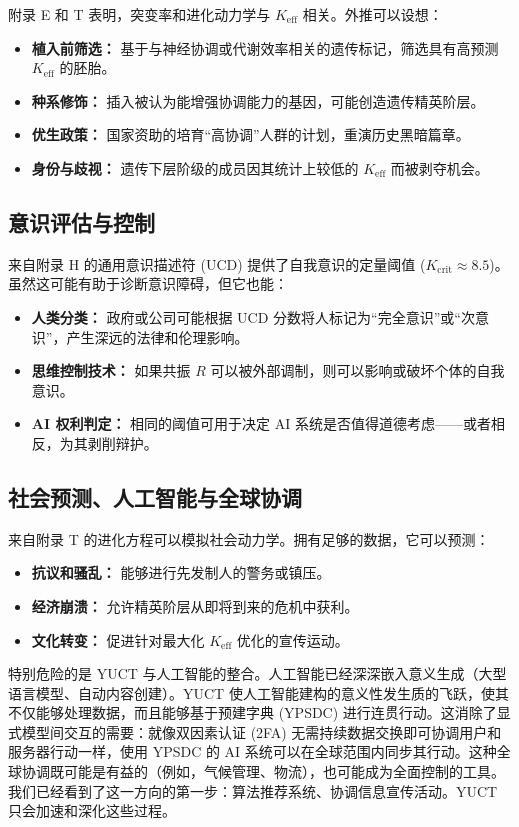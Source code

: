 \documentclass[12pt,a4paper]{article}
\theoremstyle{remark}
\newcommand{\Keff}{K_{\mathrm{eff}}}
\newcommand{\Kcrit}{K_{\mathrm{crit}}}
\begin{document}
	附录 E 和 T 表明，突变率和进化动力学与 \(\Keff\) 相关。外推可以设想：
	\begin{itemize}[leftmargin=*]
		\item \textbf{植入前筛选：} 基于与神经协调或代谢效率相关的遗传标记，筛选具有高预测 \(\Keff\) 的胚胎。
		\item \textbf{种系修饰：} 插入被认为能增强协调能力的基因，可能创造遗传精英阶层。
		\item \textbf{优生政策：} 国家资助的培育“高协调”人群的计划，重演历史黑暗篇章。
		\item \textbf{身份与歧视：} 遗传下层阶级的成员因其统计上较低的 \(\Keff\) 而被剥夺机会。
	\end{itemize}
	
	\subsection{意识评估与控制}
	\label{subsec:consciousness}
	
	来自附录 H 的通用意识描述符 (UCD) 提供了自我意识的定量阈值 (\(\Kcrit \approx 8.5\))。虽然这可能有助于诊断意识障碍，但它也能：
	\begin{itemize}[leftmargin=*]
		\item \textbf{人类分类：} 政府或公司可能根据 UCD 分数将人标记为“完全意识”或“次意识”，产生深远的法律和伦理影响。
		\item \textbf{思维控制技术：} 如果共振 \(R\) 可以被外部调制，则可以影响或破坏个体的自我意识。
		\item \textbf{AI 权利判定：} 相同的阈值可用于决定 AI 系统是否值得道德考虑——或者相反，为其剥削辩护。
	\end{itemize}
	
	\subsection{社会预测、人工智能与全球协调}
	\label{subsec:social}
	
	来自附录 T 的进化方程可以模拟社会动力学。拥有足够的数据，它可以预测：
	\begin{itemize}[leftmargin=*]
		\item \textbf{抗议和骚乱：} 能够进行先发制人的警务或镇压。
		\item \textbf{经济崩溃：} 允许精英阶层从即将到来的危机中获利。
		\item \textbf{文化转变：} 促进针对最大化 \(\Keff\) 优化的宣传运动。
	\end{itemize}
	
	特别危险的是 YUCT 与人工智能的整合。人工智能已经深深嵌入意义生成（大型语言模型、自动内容创建）。YUCT 使人工智能建构的意义性发生质的飞跃，使其不仅能够处理数据，而且能够基于预建字典 (YPSDC) 进行连贯行动。这消除了显式模型间交互的需要：就像双因素认证 (2FA) 无需持续数据交换即可协调用户和服务器行动一样，使用 YPSDC 的 AI 系统可以在全球范围内同步其行动。这种全球协调既可能是有益的（例如，气候管理、物流），也可能成为全面控制的工具。我们已经看到了这一方向的第一步：算法推荐系统、协调信息宣传活动。YUCT 只会加速和深化这些过程。
	
\end{document}
